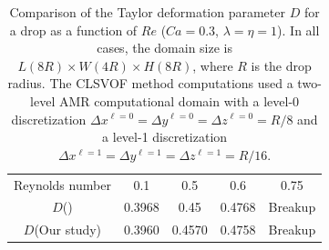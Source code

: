\documentclass{elsarticle}
\newcommand{\lwh}[3]{L(#1R)\times W(#2R) \times H(#3R)}
\begin{document}
%
\begin{table}[tbh]
\caption{Comparison of the Taylor deformation parameter $D$ for a drop as a function of $Re$ ($Ca=0.3$, $\lambda = \eta = 1$). In all cases, the domain size is $\lwh{8}{4}{8}$, where $R$ is the drop radius.  The CLSVOF method computations used a two-level AMR computational domain with a level-0 discretization $\Delta x^{\ell=0} = \Delta y^{\ell=0} = \Delta z^{\ell=0} = R/8$ and a level-1 discretization $\Delta x^{\ell=1} = \Delta y^{\ell=1} = \Delta z^{\ell=1} = R/16$.}
\label{tab:DeComparison}
\center
\begin{tabular}{ c  c  c  c  c }
\hline
\hline
Reynolds number                      & 0.1     & 0.5     & 0.6     & 0.75      \\
$D$(\citet{LiRenRen00})  & 0.3968  & 0.45    & 0.4768  & Breakup   \\
$D$(Our study) & 0.3960  & 0.4570  & 0.4758  & Breakup   \\
\hline
\hline
\end{tabular}
\end{table}


\end{document}
